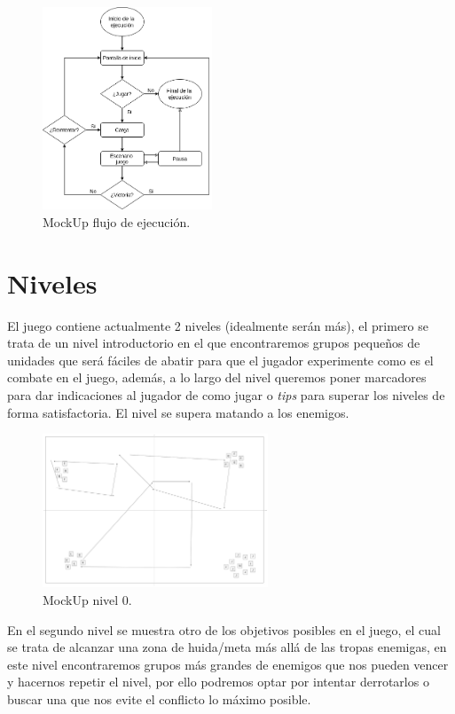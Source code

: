 \begin{figure}[ht]
\centering
\includegraphics[width=0.45\textwidth]{imagenes/gdd/pantallas/flow_ejecucion.png}
\caption{MockUp flujo de ejecución.}
\label{esq:flow_juego}
\end{figure}

\section{Niveles}
El juego contiene actualmente 2 niveles (idealmente serán más), el primero se trata de un nivel introductorio
en el que encontraremos grupos pequeños de unidades que será fáciles de abatir para que el jugador experimente
como es el combate en el juego, además, a lo largo del nivel queremos poner marcadores para dar indicaciones
al jugador de como jugar o \textit{tips} para superar los niveles de forma satisfactoria.
El nivel se supera matando a los enemigos.

\begin{figure}[ht]
\centering
\includegraphics[width=0.6\textwidth]{imagenes/gdd/nivel0.png}
\caption{MockUp nivel 0.}
\label{esq:lvl0}
\end{figure}

En el segundo nivel se muestra otro de los objetivos posibles en el juego, el cual se trata de alcanzar
una zona de huida/meta más allá de las tropas enemigas, en este nivel encontraremos
grupos más grandes de enemigos que nos pueden vencer y hacernos repetir el nivel, por ello podremos optar
por intentar derrotarlos o buscar una que nos evite el conflicto lo máximo posible. 

